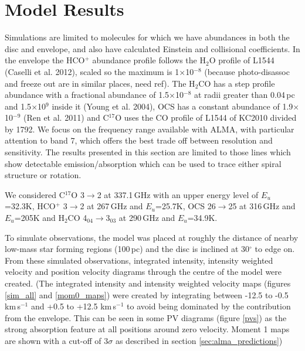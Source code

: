 \documentclass[useAMS,usenatbib]{mn2e}
\begin{document}
\section{Model Results} \label{sec:model_results}

Simulations are limited to molecules for which we have abundances in both the disc and envelope, and also have calculated Einstein and collisional coefficients. In the envelope the HCO$^+$ abundance profile follows the H$_2$O profile of L1544 (Caselli et al. 2012), scaled so the maximum is 1$\times$10$^{-8}$ (because photo-disassoc and freeze out are in similar places, need ref). The H$_2$CO has a step profile abundance with a fractional abundance of 1.5$\times$10$^{-8}$ at radii greater than 0.04$\,$pc and 1.5$\times$10$^{9}$ inside it (Young et al. 2004), OCS has a constant abundance of 1.9$\times$10$^{-9}$ (Ren et al. 2011) and C$^{17}$O uses the CO profile of L1544 of KC2010 divided by 1792. We focus on the frequency range available with ALMA, with particular attention to band 7, which offers the best trade off between resolution and sensitivity. The results presented in this section are limited to those lines which show detectable emission/absorption which can be used to trace either spiral structure or rotation.\newline

We considered C$^{17}$O 3$\rightarrow$2 at 337.1$\,$GHz with an upper energy level of $E_u$=32.3K, HCO$^+$ 3$\rightarrow$2 at 267$\,$GHz and $E_u$=25.7K, OCS 26$\rightarrow$25 at 316$\,$GHz and $E_u$=205K and H$_2$CO 4$_{04}\rightarrow$3$_{03}$ at 290$\,$GHz and $E_u$=34.9K.\newline

To simulate observations, the model was placed at roughly the distance of nearby low-mass star forming regions (100$\,$pc) and the disc is inclined at 30$^\circ$ to edge on. From these simulated observations, integrated intensity, intensity weighted velocity and position velocity diagrams through the centre of the model were created.
(The integrated intensity and intensity weighted velocity maps (figures \ref{sim_all} and \ref{mom0_maps}) were created by integrating between -12.5 to -0.5 km$\,$s$^{-1}$ and +0.5 to +12.5 km$\,$s$^{-1}$ to avoid being dominated by the contribution from the envelope. This can be seen in some PV diagrams  (figure \ref{pvs}) as the strong absorption feature at all positions around zero velocity. Moment 1 maps are shown with a cut-off of 3$\sigma$ as described in section \ref{sec:alma_predictions})\newline
\end{document}
